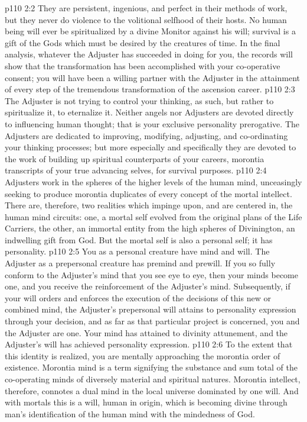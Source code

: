 \vs p110 2:2 They are persistent, ingenious, and perfect in their methods of work, but they never do violence to the volitional selfhood of their hosts. No human being will ever be spiritualized by a divine Monitor against his will; survival is a gift of the Gods which must be desired by the creatures of time. In the final analysis, whatever the Adjuster has succeeded in doing for you, the records will show that the transformation has been accomplished with your co\hyp{}operative consent; you will have been a willing partner with the Adjuster in the attainment of every step of the tremendous transformation of the ascension career.
\pc \vs p110 2:3 The Adjuster is not trying to control your thinking, as such, but rather to spiritualize it, to eternalize it. Neither angels nor Adjusters are devoted directly to influencing human thought; that is your exclusive personality prerogative. The Adjusters are dedicated to improving, modifying, adjusting, and co\hyp{}ordinating your thinking processes; but more especially and specifically they are devoted to the work of building up spiritual counterparts of your careers, morontia transcripts of your true advancing selves, for survival purposes.
\vs p110 2:4 Adjusters work in the spheres of the higher levels of the human mind, unceasingly seeking to produce morontia duplicates of every concept of the mortal intellect. There are, therefore, two realities which impinge upon, and are centered in, the human mind circuits: one, a mortal self evolved from the original plans of the Life Carriers, the other, an immortal entity from the high spheres of Divinington, an indwelling gift from God. But the mortal self is also a personal self; it has personality.
\pc \vs p110 2:5 You as a personal creature have mind and will. The Adjuster as a prepersonal creature has premind and prewill. If you so fully conform to the Adjuster’s mind that you see eye to eye, then your minds become one, and you receive the reinforcement of the Adjuster’s mind. Subsequently, if your will orders and enforces the execution of the decisions of this new or combined mind, the Adjuster’s prepersonal will attains to personality expression through your decision, and as far as that particular project is concerned, you and the Adjuster are one. Your mind has attained to divinity attunement, and the Adjuster’s will has achieved personality expression.
\vs p110 2:6 To the extent that this identity is realized, you are mentally approaching the morontia order of existence. Morontia mind is a term signifying the substance and sum total of the co\hyp{}operating minds of diversely material and spiritual natures. Morontia intellect, therefore, connotes a dual mind in the local universe dominated by one will. And with mortals this is a will, human in origin, which is becoming divine through man’s identification of the human mind with the mindedness of God.
